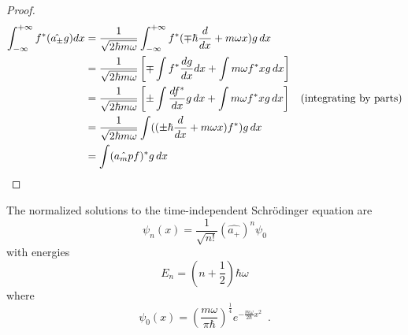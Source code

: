 \begin{proof}
\pf
\begin{align*}
\int_{-\infty}^{+ \infty} f^* (\hat{a_\pm} g) dx
& = \frac{1}{\sqrt{2 \hbar m \omega}} \int_{- \infty}^{+ \infty}
f^* (\mp \hbar \frac{d}{dx} + m \omega x) g \, dx \\
& = \frac{1}{\sqrt{2 \hbar m \omega}} \left[
\mp \int f^* \frac{dg}{dx} dx + \int m \omega f^* x g \, dx \right] \\
& = \frac{1}{\sqrt{2 \hbar m \omega}} \left[ \pm \int \frac{df^*}{dx} g \, dx + \int m \omega f^* x g \, dx \right] & (\text{integrating by parts}) \\
& = \frac{1}{\sqrt{2 \hbar m \omega}} \int ((\pm \hbar \frac{d}{dx} + m \omega x)f^*) g \, dx \\
& = \int (\hat{a_mp} f)^* g \, dx & \qed
\end{align*}
\end{proof}

\begin{prop}
\label{prop:solve_qho}
The normalized solutions to the time-independent Schr\"{o}dinger equation are
\[ \psi_n(x) = \frac{1}{\sqrt{n!}} (\hat{a_+})^n \psi_0 \]
with energies
\[ E_n = \left( n + \frac{1}{2} \right) \hbar \omega \]
where
\[ \psi_0(x) = \left( \frac{m \omega}{\pi \hbar} \right)^{\frac{1}{4}} e^{- \frac{m \omega}{2 \hbar} x^2} \enspace . \]
\end{prop}


